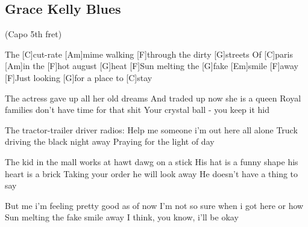 \subsection*{Grace Kelly Blues   }
\begin{guitar}
(Capo 5th fret)

The [C]cut-rate [Am]mime walking [F]through the dirty [G]streets
Of [C]paris [Am]in the [F]hot august [G]heat
[F]Sun melting the [G]fake [Em]smile [F]away
[F]Just looking [G]for a place to [C]stay

The actress gave up all her old dreams
And traded up now she is a queen
Royal families don't have time for that shit
Your crystal ball - you keep it hid

The tractor-trailer driver radios:
Help me someone i'm out here all alone
Truck driving the black night away
Praying for the light of day

The kid in the mall works at hawt dawg on a stick
His hat is a funny shape his heart is a brick
Taking your order he will look away
He doesn't have a thing to say

But me i'm feeling pretty good as of now
I'm not so sure when i got here or how
Sun melting the fake smile away
I think, you know, i'll be okay

\end{guitar}
